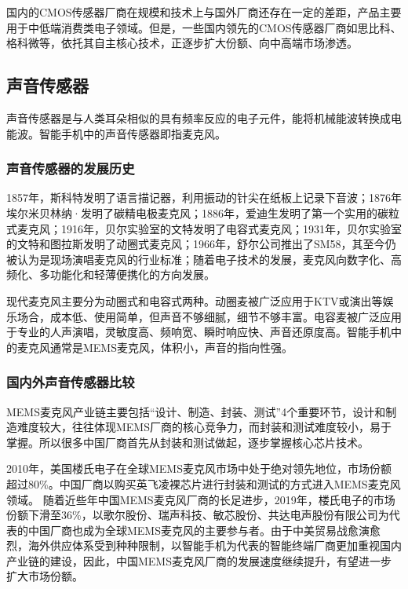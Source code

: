 \documentclass[a4paper,11pt,onecolumn,twoside]{article}
\begin{document}
\begin{multicols}{2}
国内的CMOS传感器厂商在规模和技术上与国外厂商还存在一定的差距，产品主要用于中低端消费类电子领域。但是，一些国内领先的CMOS传感器厂商如思比科、格科微等，依托其自主核心技术，正逐步扩大份额、向中高端市场渗透。

\subsection{声音传感器}

声音传感器是与人类耳朵相似的具有频率反应的电子元件，能将机械能波转换成电能波。智能手机中的声音传感器即指麦克风。

\subsubsection{声音传感器的发展历史}

1857年，斯科特发明了语言描记器，利用振动的针尖在纸板上记录下音波；1876年埃尔米贝林纳·发明了碳精电极麦克风；1886年，爱迪生发明了第一个实用的碳粒式麦克风；1916年，贝尔实验室的文特发明了电容式麦克风；1931年，贝尔实验室的文特和图拉斯发明了动圈式麦克风；1966年，舒尔公司推出了SM58，其至今仍被认为是现场演唱麦克风的行业标准；随着电子技术的发展，麦克风向数字化、高频化、多功能化和轻薄便携化的方向发展。

现代麦克风主要分为动圈式和电容式两种。动圈麦被广泛应用于KTV或演出等娱乐场合，成本低、使用简单，但声音不够细腻，细节不够丰富。电容麦被广泛应用于专业的人声演唱，灵敏度高、频响宽、瞬时响应快、声音还原度高。智能手机中的麦克风通常是MEMS麦克风，体积小，声音的指向性强。

\subsubsection{国内外声音传感器比较}


MEMS麦克风产业链主要包括“设计、制造、封装、测试”4个重要环节，设计和制造难度较大，往往体现MEMS厂商的核心竞争力，而封装和测试难度较小，易于掌握。所以很多中国厂商首先从封装和测试做起，逐步掌握核心芯片技术。

2010年，美国楼氏电子在全球MEMS麦克风市场中处于绝对领先地位，市场份额超过80\%。中国厂商以购买英飞凌裸芯片进行封装和测试的方式进入MEMS麦克风领域。 随着近些年中国MEMS麦克风厂商的长足进步，2019年，楼氏电子的市场份额下滑至36\%，以歌尔股份、瑞声科技、敏芯股份、共达电声股份有限公司为代表的中国厂商也成为全球MEMS麦克风的主要参与者。由于中美贸易战愈演愈烈，海外供应体系受到种种限制，以智能手机为代表的智能终端厂商更加重视国内产业链的建设，因此，中国MEMS麦克风厂商的发展速度继续提升，有望进一步扩大市场份额。


\end{multicols}
\end{document}
